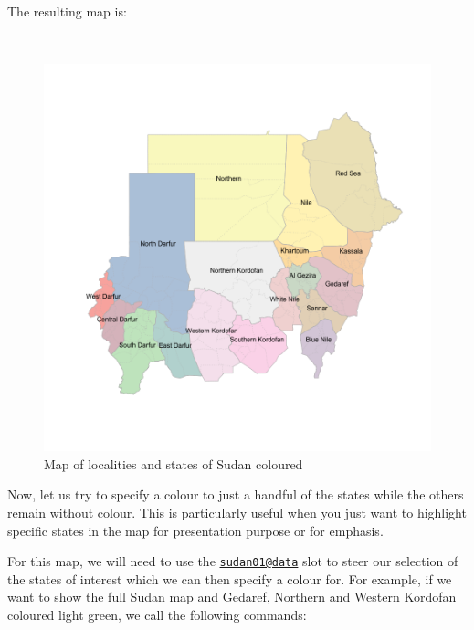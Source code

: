 \documentclass[12pt,a4paper,a4paper]{book}
\theoremstyle{definition}
\theoremstyle{definition}
\theoremstyle{definition}
\theoremstyle{remark}
\begin{document}
\newpage

The resulting map is:

~

\begin{figure}[H]

{\centering \includegraphics{figures/map9-1} 

}

\caption{Map of localities and states of Sudan coloured }\label{fig:map9}
\end{figure}

\newpage

Now, let us try to specify a colour to just a handful of the states
while the others remain without colour. This is particularly useful when
you just want to highlight specific states in the map for presentation
purpose or for emphasis.

For this map, we will need to use the
\href{mailto:sudan01@data}{\nolinkurl{sudan01@data}} slot to steer our
selection of the states of interest which we can then specify a colour
for. For example, if we want to show the full Sudan map and Gedaref,
Northern and Western Kordofan coloured light green, we call the
following commands:

~
\end{document}
